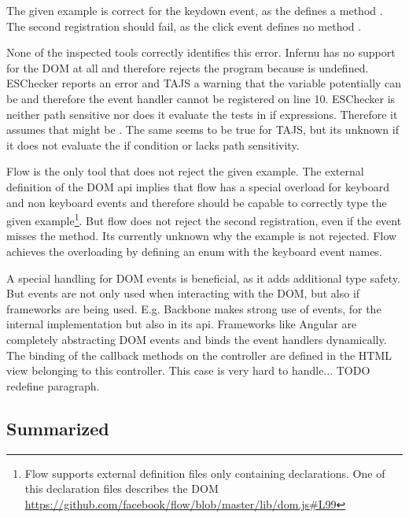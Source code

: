 
The given example is correct for the keydown event, as the  defines a method . The second registration should fail, as the click event defines no method . 

None of the inspected tools correctly identifies this error. Infernu has no support for the DOM at all and therefore rejects the program because  is undefined. ESChecker reports an error and TAJS a warning that the variable  potentially can be  and therefore the event handler cannot be registered on line 10. ESChecker is neither path sensitive nor does it evaluate the tests in if expressions. Therefore it assumes that  might be . The same seems to be true for TAJS, but its unknown if it does not evaluate the if condition or lacks path sensitivity. 

Flow is the only tool that does not reject the given example. The external definition of the DOM api implies that flow has a special overload for keyboard and non keyboard events and therefore should be capable to correctly type the given example\footnote{Flow supports external definition files only containing declarations. One of this declaration files describes the DOM \url{https://github.com/facebook/flow/blob/master/lib/dom.js\#L99}}. But flow does not reject the second registration, even if the event misses the  method. Its currently unknown why the example is not rejected. Flow achieves the overloading by defining an enum with the keyboard event names. 

A special handling for DOM events is beneficial, as it adds additional type safety. But events are not only used when interacting with the DOM, but also if frameworks are being used. E.g. Backbone makes strong use of events, for the internal implementation but also in its api. Frameworks like Angular are completely abstracting DOM events and binds the event handlers dynamically. The binding of the callback methods on the controller are defined in the HTML view belonging to this controller. This case is very hard to handle... TODO redefine paragraph. 

\subsection{Summarized}
